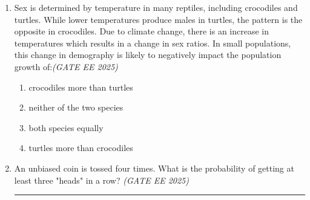 \begin{enumerate}[leftmargin=*,label=\textbf{Q.\arabic*},resume]
\item Sex is determined by temperature in many reptiles, including crocodiles and turtles. While lower temperatures produce males in turtles, the pattern is the opposite in crocodiles. Due to climate change, there is an increase in temperatures which results in a change in sex ratios. In small populations, this change in demography is likely to negatively impact the population growth of:\hfill \textit{(GATE EE 2025)}
\begin{multicols}{2}
\begin{enumerate}[label=(\Alph*)]
\item crocodiles more than turtles
\item neither of the two species
\item both species equally
\item turtles more than crocodiles
\end{enumerate}
\end{multicols}

\item An unbiased coin is tossed four times. What is the probability of getting at least three "heads" in a row? \hfill \textit{(GATE EE 2025)}

\rule{4cm}{0.15mm}


\end{enumerate}
